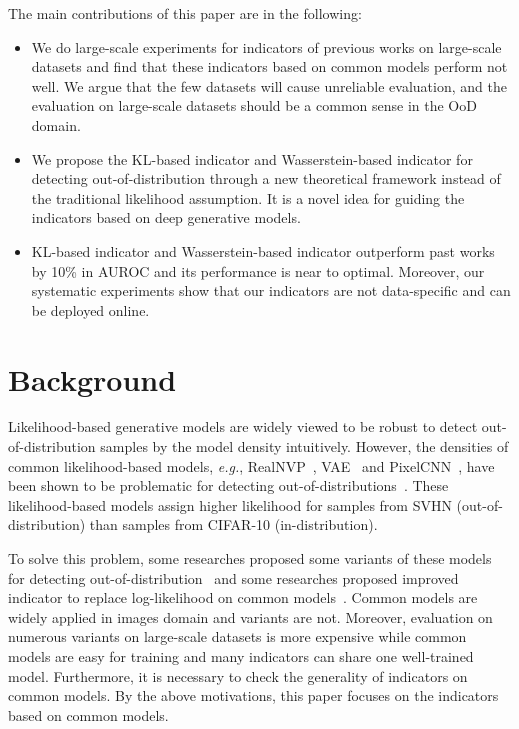 \documentclass[letterpaper]{article} %
\newcommand{\EG}{\textit{e.g.}, }
\begin{document}
The main contributions of this paper are in the following:
\begin{itemize}
	\item We do large-scale experiments for indicators of previous works on large-scale datasets and find that these indicators based on common models perform not well. We argue that the few datasets will cause unreliable evaluation, and the evaluation on large-scale datasets should be a common sense in the OoD domain. 
	\item We propose the KL-based indicator and Wasserstein-based indicator for detecting out-of-distribution through a new theoretical framework instead of the traditional likelihood assumption. It is a novel idea for guiding the indicators based on deep generative models. 
	\item KL-based indicator and Wasserstein-based indicator outperform past works by 10\% in AUROC and its performance is near to optimal. Moreover, our systematic experiments show that our indicators are not data-specific and can be deployed online. 
\end{itemize}

\section{Background}
Likelihood-based generative models are widely viewed to be robust to detect out-of-distribution samples by the model density intuitively. However, the densities of common likelihood-based models, \EG RealNVP~\cite{dinh2016density}, VAE~\cite{tomczak2018vae,takahashi2019variational} and PixelCNN~\cite{van2016conditional}, have been shown to be problematic for detecting out-of-distributions~\cite{nalisnick2019do}. These likelihood-based models assign higher likelihood for samples from SVHN (out-of-distribution) than samples from CIFAR-10 (in-distribution). 

To solve this problem, some researches proposed some variants of these models for detecting out-of-distribution~\cite{che2019deep} and some researches proposed improved indicator to replace log-likelihood on common models~\cite{serra2019input}. Common models are widely applied in images domain and variants are not. Moreover, evaluation on numerous variants on large-scale datasets is more expensive while common models are easy for training and many indicators can share one well-trained model. Furthermore, it is necessary to check the generality of indicators on common models. By the above motivations, this paper focuses on the indicators based on common models. 
\end{document}
